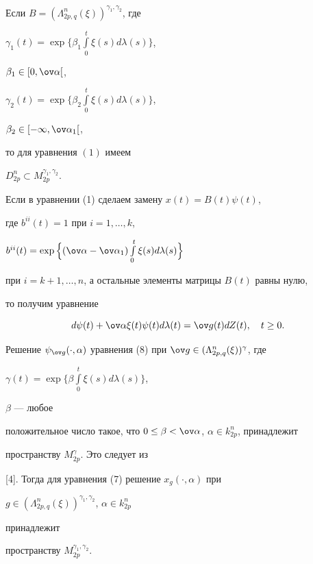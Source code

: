  


\begin{thm} 


Если $B=(\Lambda^n_{2p,q}(\xi))^{\gamma_1,\gamma_2}$, где 


$\gamma_1(t)=\exp\Big\{\beta_1\int\limits^t_0 \xi(s)d\lambda(s)\Big\}$, 


$\beta_1\in[0,\ov\alpha[$, 


$\gamma_2(t)=\exp\Big\{\beta_2\int\limits^t_0 \xi(s)d\lambda(s)\Big\}$, 


$\beta_2\in[-\infty,\ov\alpha_1[$, 


то для уравнения $(1)$ имеем 


$D^n_{2p}\subset M^{\gamma_1,\gamma_2}_{2p}$. 


\end{thm} 


 


\begin{pf} 


Если в уравнении (1) сделаем замену $x(t)=B(t)\psi(t)$, 


где $b^{ii}(t)=1$ при $i=1,\dotsc,k$, 


$b^{ii}(t)=\exp\Big\{(\ov\alpha-\ov\alpha_1) 


\int\limits^t_0\xi(s)d\lambda(s)\Big\}$ 


при $i=k+1,\dotsc,n$, а остальные элементы матрицы $B(t)$ равны нулю, 


то получим уравнение 


\begin{equation} 


d\psi(t)+\ov\alpha\xi(t)\psi(t)d\lambda(t)= 


\ov g(t)d Z(t),\quad t\ge0. 


\end{equation} 


Решение $\psi_{\ov g}(\cdot,\alpha)$ уравнения (8) при $\ov 


g\in(\Lambda^n_{2p,q}(\xi))^\gamma$, где 


$\gamma(t)=\exp\Big\{\beta\int\limits^t_0 \xi(s)d\lambda(s)\Big\}$, 


$\beta$ --- любое 


положительное число такое, что $0\le\beta<\ov\alpha$, $\alpha\in 


k^n_{2p}$, принадлежит 


пространству $M^\gamma_{2p}$. Это следует из 


[4]. Тогда для уравнения (7) решение $x_g(\cdot,\alpha)$ при 


$g\in(\Lambda^n_{2p,q}(\xi))^{\gamma_1,\gamma_2}$, $\alpha\in k^n_{2p}$ 


принадлежит 


пространству $M^{\gamma_1,\gamma_2}_{2p}$. 


\end{pf} 


